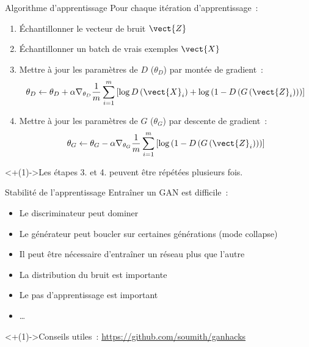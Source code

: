 \begin{frame}{Algorithme d'apprentissage}
  Pour chaque itération d'apprentissage~:

  \begin{enumerate}[<+(1)->]
    \item Échantillonner le vecteur de bruit $\vect{Z}$
    \item Échantillonner un batch de vrais exemples $\vect{X}$
    \item Mettre à jour les paramètres de $D$ ($\theta_D$) 
          par montée de gradient~:
    \[
      \theta_D \leftarrow \theta_D + \alpha \nabla_{\theta_D} \frac{1}{m} \sum_{i=1}^m \left[
        \log D\left(\vect{X}_i\right) + \log\left(1 - D\left(G\left(\vect{Z}_i\right)\right)\right)
      \right]
    \]
    \item Mettre à jour les paramètres de $G$ ($\theta_G$) 
          par descente de gradient~:
    \[
      \theta_G \leftarrow \theta_G - \alpha \nabla_{\theta_G} \frac{1}{m} \sum_{i=1}^m \left[
        \log\left(1 - D\left(G\left(\vect{Z}_i\right)\right)\right)
      \right]
    \]
  \end{enumerate}
  \onslide<+(1)->{Les étapes 3. et 4. peuvent être répétées plusieurs fois.}
\end{frame}

\begin{frame}{Stabilité de l'apprentissage}
  Entraîner un GAN est difficile~:
  \begin{itemize}[<+(1)->]
    \item Le discriminateur peut dominer
    \item Le générateur peut boucler sur certaines générations (mode collapse)
    \item Il peut être nécessaire d'entraîner un réseau plus que l'autre
    \item La distribution du bruit est importante
    \item Le pas d'apprentissage est important
    \item …
  \end{itemize}

  \onslide<+(1)->{Conseils utiles~: \url{https://github.com/soumith/ganhacks}}
\end{frame}
